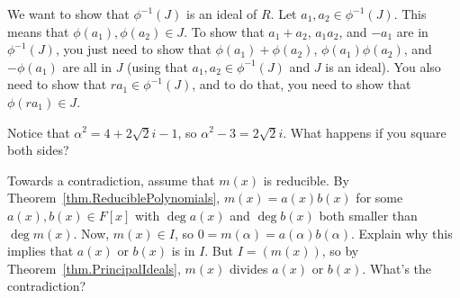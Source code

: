 \begin{hint*}
We want to show that $\phi^{-1}(J)$ is an ideal of $R$. Let $a_1,a_2\in \phi^{-1}(J)$. This means that $\phi(a_1),\phi(a_2)\in J$. To show that $a_1+a_2$, $a_1a_2$, and $-a_1$ are in $\phi^{-1}(J)$, you just need to show that $\phi(a_1)+\phi(a_2)$, $\phi(a_1)\phi(a_2)$, and $-\phi(a_1)$ are all in $J$ (using that $a_1,a_2\in \phi^{-1}(J)$ and $J$ is an ideal). You also need to show that $ra_1\in \phi^{-1}(J)$, and to do that, you need to show that  $\phi(ra_1)\in J$.
\end{hint*}


\begin{hint*}
Notice that $\alpha^2 = 4 + 2\sqrt{2}i -1$, so $\alpha^2 -3 = 2\sqrt{2}i$. What happens if you square both sides?
\end{hint*}

\begin{hint*}
Towards a contradiction, assume that $m(x)$ is reducible. By Theorem~\ref{thm.ReduciblePolynomials}, $m(x) = a(x)b(x)$ for some $a(x),b(x)\in F[x]$ with $\deg a(x)$ and $\deg b(x)$ both smaller than $\deg m(x)$. Now, $m(x)\in I$, so $0 = m(\alpha) = a(\alpha)b(\alpha)$. Explain why this implies that $a(x)$ or $b(x)$ is in $I$. But $I = (m(x))$, so by Theorem~\ref{thm.PrincipalIdeals}, $m(x)$ divides $a(x)$ or $b(x)$. What's the contradiction?
\end{hint*}






